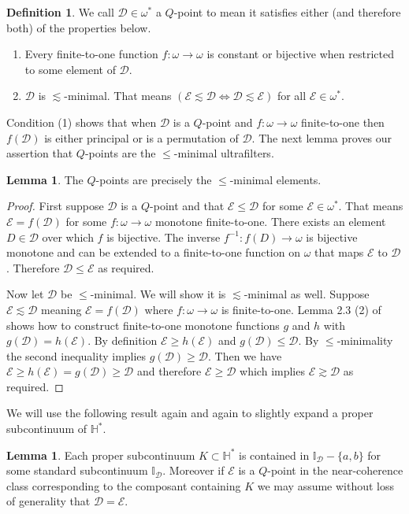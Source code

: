 \documentclass[12pt]{article}
\theoremstyle{plain}
\theoremstyle{definition}
\newtheorem{lemma}[theorem]{Lemma}
\newtheorem{definition}[theorem]{Definition}
\newcommand{\W}{\ensuremath{\omega}}
\newcommand{\II}{\ensuremath{\mathbb I}}
\newcommand{\HH}{\ensuremath{\mathbb H}}
\newcommand{\0}{\ensuremath{\varnothing}}
\newcommand{\cD}{\ensuremath{\mathcal D}}
\newcommand{\cE}{\ensuremath{\mathcal E}}
\begin{document}
	
	\begin{definition} We call $\cD \in \W^*$ a $Q$-point to mean it satisfies either (and therefore both) of the properties below.
		\begin{enumerate}
			\item Every finite-to-one function $f \colon \W \to \W$ is constant or bijective when restricted to some element of $\cD$.
			\item $\cD$ is $\lesssim$-minimal. That means $(\cE \lesssim \cD \iff \cD \lesssim \cE)$ for all $\cE \in \W^*$.
		\end{enumerate}
	\end{definition}
	
	Condition (1) shows that when $\cD$ is a $Q$-point and $f \colon \W \to \W$ finite-to-one 
	then $f(\cD)$ is either principal or is a permutation of $\cD$. 
	The next lemma proves our assertion that $Q$-points are the $\le$-minimal ultrafilters.
	
	\begin{lemma} \label{leminimal}
		The $Q$-points are precisely the $\le$-minimal elements.
	\end{lemma}
	
	\begin{proof}
		First suppose $\cD$ is a $Q$-point and that $\cE \le \cD$ for some $\cE \in \W^*$. 
		That means $\cE = f(\cD)$ for some $f \colon \W \to \W$ monotone finite-to-one. 
		There exists an element $D \in \cD$ over which $f$ is bijective. 
		The inverse $f^{-1} \colon f(D) \to \W$ is bijective monotone 
		and can be extended to a finite-to-one function on $\W$ that maps $\cE$ to $\cD$. 
		Therefore $\cD \le \cE$ as required.
		
		Now let $\cD$ be $\le$-minimal. 
		We will show it is $\lesssim$-minimal as well. 
		Suppose $\cE \lesssim \cD$ meaning $\cE = f(\cD)$ where $f \colon \W \to \W$ is finite-to-one.  
		Lemma 2.3 (2) of \cite{RBOrder} shows how to construct finite-to-one monotone functions $g$ and $h$ with $g(\cD)=h(\cE)$.
		By definition $\cE \ge h(\cE)$ and $g(\cD) \le \cD$. 
		By $\le$-minimality the second inequality implies $g(\cD) \ge \cD$. 
		Then we have $\cE \ge h(\cE) = g(\cD) \ge \cD$ and therefore $\cE \ge \cD$ which implies $\cE \gtrsim \cD$ as required.
	\end{proof}
	
	We will use the following result again and again to slightly expand a proper subcontinuum of $\HH^*$.
	
	
	\begin{lemma} \label{bulge}
		Each proper subcontinuum $K \subset \HH^*$ is contained in $\II_\cD - \{a,b\}$ for some standard subcontinuum $\II_\cD$. Moreover if $\cE$ is a $Q$-point in the near-coherence class corresponding to the composant containing $K$ we may assume without loss of generality that $\cD=\cE$.
	\end{lemma}
	
\end{document}
